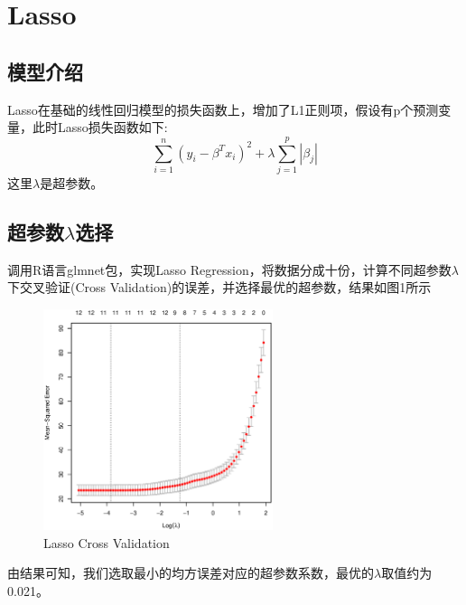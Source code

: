 \section{Lasso}
   \subsection{模型介绍}
   Lasso在基础的线性回归模型的损失函数上，增加了L1正则项，假设有p个预测变量，此时Lasso损失函数如下:
   \begin{equation}
    \sum_{i=1}^n(y_i-\beta^Tx_i)^2+\lambda\sum_{j=1}^p|\beta_j|
   \end{equation}
   这里$\lambda$是超参数。
   
    \subsection{超参数$\lambda$选择}
    调用R语言glmnet包，实现Lasso Regression，将数据分成十份，计算不同超参数$\lambda$下交叉验证(Cross Validation)的误差，并选择最优的超参数，结果如图1所示
    \begin{figure}[htbp]
        \centering
        \includegraphics[width=0.6\textwidth]{lassocv.eps}
        \caption{Lasso Cross Validation}
    \end{figure}
    由结果可知，我们选取最小的均方误差对应的超参数系数，最优的$\lambda$取值约为0.021。
